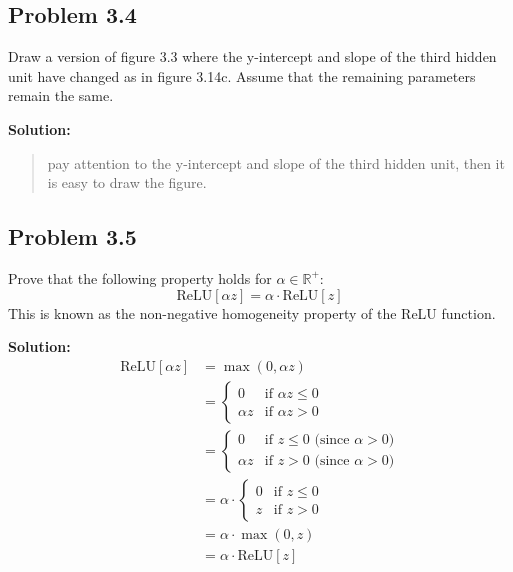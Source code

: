 \documentclass{article}
\begin{document}
    \subsection*{Problem 3.4}
    Draw a version of figure 3.3 where the y-intercept and slope of the third hidden unit have changed as in figure 3.14c. Assume that the remaining parameters remain the same.

        \vspace{1cm}
        \textbf{Solution:}
        \begin{quote}
            pay attention to the y-intercept and slope of the third hidden unit, then it is easy to draw the figure.
        \end{quote}

    \subsection*{Problem 3.5}
    Prove that the following property holds for $\alpha \in \mathbb{R^+}$:
    \begin{equation}
        \text{ReLU}[\alpha z] = \alpha \cdot \text{ReLU}[z]
        \tag{3.14}
    \end{equation}
    This is known as the non-negative homogeneity property of the ReLU function.

        \vspace{1cm}
        \textbf{Solution:}
        \begin{align*}
            \text{ReLU}[\alpha z] &= \max(0, \alpha z) \\
            &= \begin{cases}
                0 & \text{if } \alpha z \leq 0 \\
                \alpha z & \text{if } \alpha z > 0
            \end{cases} \\
            &= \begin{cases}
                0 & \text{if } z \leq 0 \text{ (since } \alpha > 0\text{)} \\
                \alpha z & \text{if } z > 0 \text{ (since } \alpha > 0\text{)}
            \end{cases} \\
            &= \alpha \cdot \begin{cases}
                0 & \text{if } z \leq 0 \\
                z & \text{if } z > 0
            \end{cases} \\
            &= \alpha \cdot \max(0, z) \\
            &= \alpha \cdot \text{ReLU}[z]
        \end{align*}
\end{document}
